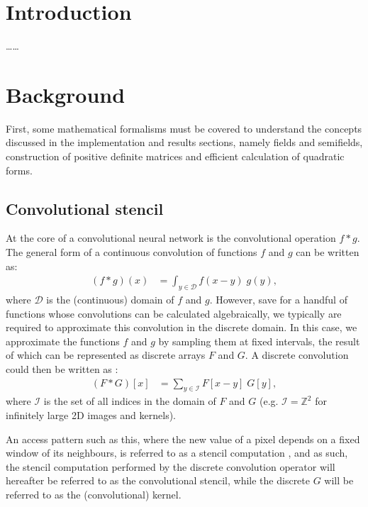 \documentclass[a4paper, 12pt]{report}
\def\comment#1{\color{red}#1\color{black}}
\begin{document}
\newpage



\setcounter{page}{1}
\pagestyle{plain} 

\chapter{Introduction}
\comment{\ldots\ldots}

\chapter{Background}
First, some mathematical formalisms must be covered to understand the concepts discussed in the implementation and results sections, namely fields and semifields, construction of positive definite matrices and efficient calculation of quadratic forms.

\section{Convolutional stencil}
At the core of a convolutional neural network is the convolutional operation $f*g$. The general form of a continuous convolution of functions $f$ and $g$ can be written as:
\begin{align*}
(f*g)(x) &= \int_{y\in\mathcal{D}} f(x-y)\; g(y)	,
\end{align*}
where $\mathcal{D}$ is the (continuous) domain of $f$ and $g$. However, save for a handful of functions whose convolutions can be calculated algebraically, we typically are required to approximate this convolution in the discrete domain. In this case, we approximate the functions $f$ and $g$ by sampling them at fixed intervals, the result of which can be represented as discrete arrays $F$ and $G$. A discrete convolution could then be written as \cite{szeliski2022computer}:
\begin{align*}
(F*G)[x] &= \sum_{y\in\mathcal{I}} F[x-y]\; G[y],
\end{align*}
where $\mathcal{I}$ is the set of all indices in the domain of $F$ and $G$ (e.g. $\mathcal{I}=\mathbb{Z}^2$ for infinitely large 2D images and kernels). 

An access pattern such as this, where the new value of a pixel depends on a fixed window of its neighbours, is referred to as a stencil computation \cite{fortranstencils}, and as such, the stencil computation performed by the discrete convolution operator will hereafter be referred to as the convolutional stencil, while the discrete $G$ will be referred to as the (convolutional) kernel.
\end{document}
